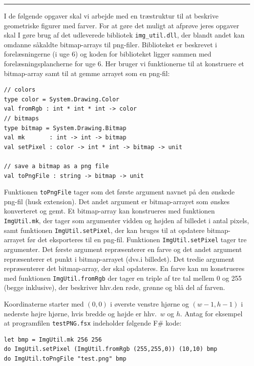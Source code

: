 \documentclass[a4paper,12pt]{article}
\begin{document}
\begin{enumerate}[label=8ø.\arabic*,start=0]
\begin{center}
\rule{0.5\linewidth}{0.4pt}
\end{center}
I de følgende opgaver skal vi arbejde med en træstruktur til at beskrive geometriske
figurer med farver.  For at gøre det muligt at afprøve jeres opgaver
skal I gøre brug af det udleverede bibliotek \texttt{img\_util.dll}, der
blandt andet kan omdanne såkaldte bitmap-arrays til png-filer.  Biblioteket er
beskrevet i forelæsningerne (i uge 6) og koden for biblioteket ligger
sammen med forelæsningsplancherne for uge 6.  Her bruger vi
funktionerne til at konstruere et bitmap-array samt til at gemme
arrayet som en png-fil:

\begin{lstlisting}[numbers=none,frame=none,mathescape]
// colors
type color = System.Drawing.Color
val fromRgb : int * int * int -> color
// bitmaps
type bitmap = System.Drawing.Bitmap
val mk       : int -> int -> bitmap
val setPixel : color -> int * int -> bitmap -> unit

// save a bitmap as a png file
val toPngFile : string -> bitmap -> unit
\end{lstlisting}

Funktionen \lstinline{toPngFile} tager som det første argument navnet
på den ønskede png-fil (husk extension).  Det andet argument er
bitmap-arrayet som ønskes konverteret og gemt. Et bitmap-array kan
konstrueres med funktionen \lstinline{ImgUtil.mk}, der tager som
argumenter vidden og højden af billedet i antal pixels, samt funktionen
\lstinline{ImgUtil.setPixel}, der kan bruges til at opdatere bitmap-arrayet
før det eksporteres til en png-fil. Funktionen \lstinline{ImgUtil.setPixel}
tager tre argumenter. Det første argument repræsenterer en farve og
det andet argument repræsenterer et punkt i bitmap-arrayet (dvs.\@ i
billedet). Det tredie argument repræsenterer det bitmap-array, der
skal opdateres.  En farve kan nu konstrueres med funktionen
\lstinline{ImgUtil.fromRgb} der tager en triple af tre tal mellem 0 og
255 (begge inklusive), der beskriver hhv.\@ den røde, grønne og blå del
af farven.

Koordinaterne starter med $(0,0)$ i øverste venstre hjørne og
$(w-1,h-1)$ i nederste højre hjørne, hvis bredde og højde er hhv.\ $w$
og $h$.  Antag for eksempel at programfilen \texttt{testPNG.fsx}
indeholder følgende F\# kode:

\begin{lstlisting}[numbers=none,frame=none,mathescape]
let bmp = ImgUtil.mk 256 256
do ImgUtil.setPixel (ImgUtil.fromRgb (255,255,0)) (10,10) bmp
do ImgUtil.toPngFile "test.png" bmp
\end{lstlisting}


\end{enumerate}
\end{document}
